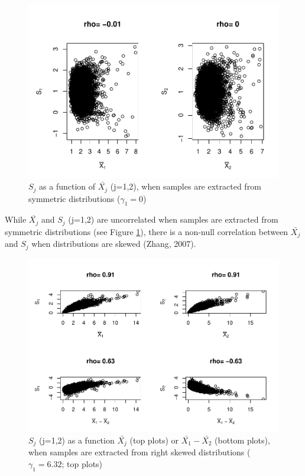 \documentclass[
  man]{apa6}
\begin{document}
\begin{figure}
\centering
\includegraphics{Correlations-between-the-sample-means-difference-and-standardizers-of-all-estimators,-and-implications-on-biases-and-variances-of-all-estimators_files/figure-latex/C1sym-1.pdf}
\caption{\label{fig:C1sym}\(S_j\) as a function of \(\bar{X_j}\) (j=1,2), when samples are extracted from symmetric distributions (\(\gamma_1 = 0\))}
\end{figure}

While \(\bar{X_j}\) and \(S_j\) (j=1,2) are uncorrelated when samples are extracted from symmetric distributions (see Figure \ref{fig:C1sym}), there is a non-null correlation between \(\bar{X_j}\) and \(S_j\) when distributions are skewed (Zhang, 2007).

\begin{figure}
\centering
\includegraphics{Correlations-between-the-sample-means-difference-and-standardizers-of-all-estimators,-and-implications-on-biases-and-variances-of-all-estimators_files/figure-latex/SDC1Rs-1.pdf}
\caption{\label{fig:SDC1Rs}\(S_j\) (j=1,2) as a function \(\bar{X_j}\) (top plots) or \(\bar{X_1}-\bar{X_2}\) (bottom plots), when samples are extracted from right skewed distributions (\(\gamma_1 = 6.32\); top plots)}
\end{figure}
\end{document}

